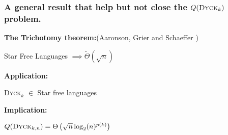 \documentclass[9pt, notheorems]{beamer}
\newcommand{\Dyck}[1]{\textsc{Dyck$_{#1}$}}
\renewcommand{\comment}[1]{}
\theoremstyle{definition}
\theoremstyle{plain}
\theoremstyle{definition}
\begin{document}
\begin{frame}
    \frametitle{A general result that help but not close the $Q(\Dyck{k})$ problem.}
    \vfill
    \textbf{The Trichotomy theorem:}(Aaronson,
    Grier and Schaeffer \cite[2019]{trichotomy_not_andris})
    \begin{center}
        {\huge Star Free Languages $\implies \tilde{\Theta}\left(\sqrt{n}\right)$ }\\
    \end{center}
    \vfill
    \pause
    \textbf{Application:}
    \begin{center}
        {\huge \Dyck{k} $\in$ Star free languages}
    \end{center}
    \pause
    \vfill
    \textbf{Implication:}
    \begin{center}
        {\huge $\comment{\exists p, }Q(\Dyck{k,n})=\Theta \left(\sqrt{n}\log_2(n)^{p(k)}\right)$}
    \end{center}
    \vfill
\end{frame}
\end{document}

